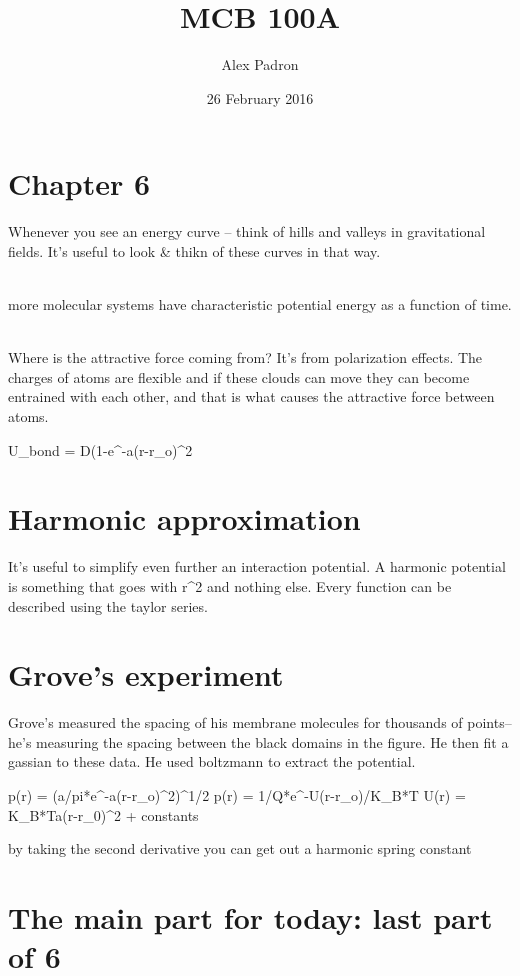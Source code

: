 \documentclass{article}
\title{MCB 100A}
\author{Alex Padron}
\date{26 February 2016}
\begin{document}
\maketitle

\section{Chapter 6}

Whenever you see an energy curve – think of hills and valleys in gravitational fields. It's useful to look & thikn of these curves in that way. 

\mbox{ }\\
more molecular systems have characteristic potential energy as a function of time. 

\mbox{ }\\
Where is the attractive force coming from? It's from polarization effects. The charges of atoms are flexible and if these clouds can move they can become entrained with each other, and that is what causes the attractive force between atoms. 

U_{bond} = D(1-e^-a(r-r_o)^2

\section{Harmonic approximation}

It's useful to simplify even further an interaction potential. A harmonic potential is something that goes with r^2 and nothing else. Every function can be described using the taylor series. 

\section{Grove's experiment}
Grove's measured the spacing of his membrane molecules for thousands of points–he's measuring the spacing between the black domains in the figure. He then fit a gassian to these data. He used boltzmann to extract the potential. 

p(r) = (a/pi*e^-a(r-r_o)^2)^1/2
p(r) = 1/Q*e^-U(r-r_o)/K_B*T
U(r) = K_B*Ta(r-r_0)^2 + constants

by taking the second derivative you can get out a harmonic spring constant

\section{The main part for today: last part of 6}
\end{document}
